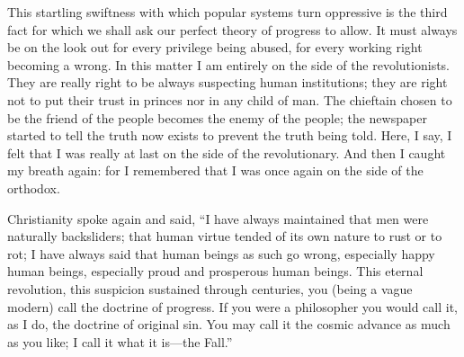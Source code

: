 \documentclass{book}
\begin{document}
This startling swiftness with which popular systems turn oppressive is the third fact for which we shall ask our perfect theory of progress to allow. It must always be on the look out for every privilege being abused, for every working right becoming a wrong. In this matter I am entirely on the side of the revolutionists. They are really right to be always suspecting human institutions; they are right not to put their trust in princes nor in any child of man. The chieftain chosen to be the friend of the people becomes the enemy of the people; the newspaper started to tell the truth now exists to prevent the truth being told. Here, I say, I felt that I was really at last on the side of the revolutionary. And then I caught my breath again: for I remembered that I was once again on the side of the orthodox.

Christianity spoke again and said, “I have always maintained that men were naturally backsliders; that human virtue tended of its own nature to rust or to rot; I have always said that human beings as such go wrong, especially happy human beings, especially proud and prosperous human beings. This eternal revolution, this suspicion sustained through centuries, you (being a vague modern) call the doctrine of progress. If you were a philosopher you would call it, as I do, the doctrine of original sin. You may call it the cosmic advance as much as you like; I call it what it is—the Fall.”
\end{document}
